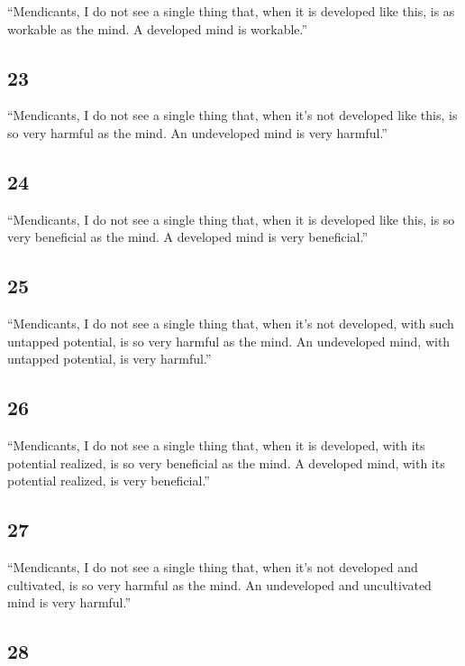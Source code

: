 \documentclass[12pt,openany]{book}%
\begin{document}
“Mendicants, I do not see a single thing that, when it is developed like this, is as workable as the mind. A developed mind is workable.” 

\subsection*{23 }

“Mendicants, I do not see a single thing that, when it’s not developed like this, is so very harmful as the mind. An undeveloped mind is very harmful.” 

\subsection*{24 }

“Mendicants, I do not see a single thing that, when it is developed like this, is so very beneficial as the mind. A developed mind is very beneficial.” 

\subsection*{25 }

“Mendicants, I do not see a single thing that, when it’s not developed, with such untapped potential, is so very harmful as the mind. An undeveloped mind, with untapped potential, is very harmful.” 

\subsection*{26 }

“Mendicants, I do not see a single thing that, when it is developed, with its potential realized, is so very beneficial as the mind. A developed mind, with its potential realized, is very beneficial.” 

\subsection*{27 }

“Mendicants, I do not see a single thing that, when it’s not developed and cultivated, is so very harmful as the mind. An undeveloped and uncultivated mind is very harmful.” 

\subsection*{28 }
\end{document}
